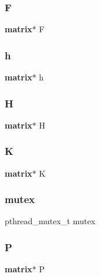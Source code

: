 \subsubsection{F}
{\footnotesize\ttfamily \textbf{ matrix}$\ast$ F}

\mbox{\label{structekf__struct_a8e142e0ead965e30c731cac0c81f0546}} 
\subsubsection{h}
{\footnotesize\ttfamily \textbf{ matrix}$\ast$ h}

\mbox{\label{structekf__struct_ab34f61f49eff3ca4e76e03d02c071f49}} 
\subsubsection{H}
{\footnotesize\ttfamily \textbf{ matrix}$\ast$ H}

\mbox{\label{structekf__struct_a7df47c23eb206e77c9cf4f9a6c35270b}} 
\subsubsection{K}
{\footnotesize\ttfamily \textbf{ matrix}$\ast$ K}

\mbox{\label{structekf__struct_a4acff8232e4aec9cd5c6dc200ac55ef3}} 
\subsubsection{mutex}
{\footnotesize\ttfamily pthread\+\_\+mutex\+\_\+t mutex}

\mbox{\label{structekf__struct_a5eef476329a6981067bd75fc6ffbaffa}} 
\subsubsection{P}
{\footnotesize\ttfamily \textbf{ matrix}$\ast$ P}

\mbox{\label{structekf__struct_ae50fecd2794ca5844d6d01efcf17294c}} 
